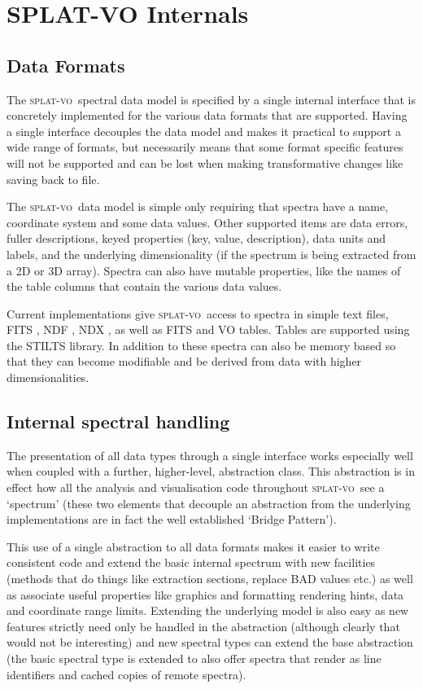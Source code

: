 \documentclass[final,authoryear,5p,times,twocolumn]{elsarticle}
\newcommand{\splatvo}{\textsc{splat-vo}}
\newcommand{\ascl}[1]{\href{http://www.ascl.net/#1}{ascl:#1}}
\begin{document}
\section{SPLAT-VO Internals}

\subsection{Data Formats}

The \splatvo\ spectral data model is specified by a single internal interface
that is concretely implemented for the various data formats that are
supported. Having a single interface decouples the data model and makes it
practical to support a wide range of formats, but necessarily means that some
format specific features will not be supported and can be lost when making
transformative changes like saving back to file.

The \splatvo\ data model is simple only requiring that spectra have a name,
coordinate system and some data values. Other supported items are data errors,
fuller descriptions, keyed properties (key, value, description), data units
and labels, and the underlying dimensionality (if the spectrum is being
extracted from a 2D or 3D array). Spectra can also have mutable properties,
like the names of the table columns that contain the various data values.

Current implementations give \splatvo\ access to spectra in simple text
files, FITS \citep{2010A&A...524A..42P}, NDF \citep{ndfjenness}, NDX
\citep{2003ASPC..295..221G}, as well as FITS and VO tables. Tables are
supported using the STILTS
\citep[][\ascl{1105.001}]{2006ASPC..351..666T} library. In addition to
these spectra can also be memory based so that they can become
modifiable and be derived from data with higher dimensionalities.

\subsection{Internal spectral handling}

The presentation of all data types through a single interface works especially
well when coupled with a further, higher-level, abstraction class. This
abstraction is in effect how all the analysis and visualisation code
throughout \splatvo\ see a `spectrum' (these two elements that decouple an
abstraction from the underlying implementations are in fact the well
established `Bridge Pattern').

This use of a single abstraction to all data formats makes it easier to write
consistent code and extend the basic internal spectrum with new facilities
(methods that do things like extraction sections, replace BAD values etc.) as
well as associate useful properties like graphics and formatting rendering
hints, data and coordinate range limits. Extending the underlying model is
also easy as new features strictly need only be handled in the abstraction
(although clearly that would not be interesting) and new spectral types can
extend the base abstraction (the basic spectral type is extended to also offer
spectra that render as line identifiers and cached copies of remote spectra).
\end{document}
